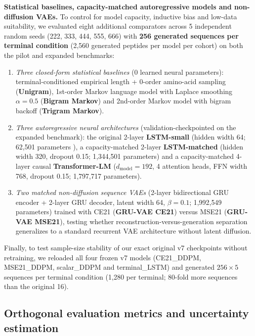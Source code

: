 \documentclass[unnumsec,webpdf,contemporary,large]{oup-authoring-template}
\newcommand{\rev}[1]{#1}
\begin{document}
\rev{\textbf{Statistical baselines, capacity-matched autoregressive models and non-diffusion VAEs.} To control for model capacity, inductive bias and low-data suitability, we evaluated eight additional comparators across 5 independent random seeds (222, 333, 444, 555, 666) with \textbf{256 generated sequences per terminal condition} (2,560 generated peptides per model per cohort) on both the pilot and expanded benchmarks:
\begin{enumerate}
\item \textit{Three closed-form statistical baselines} (0 learned neural parameters): terminal-conditioned empirical length + 0-order amino-acid sampling (\textbf{Unigram}), 1st-order Markov language model with Laplace smoothing $\alpha=0.5$ (\textbf{Bigram Markov}) and 2nd-order Markov model with bigram backoff (\textbf{Trigram Markov}).
\item \textit{Three autoregressive neural architectures} (validation-checkpointed on the expanded benchmark): the original 2-layer \textbf{LSTM-small} (hidden width 64; 62,501 parameters \cite{refLSTM}), a capacity-matched 2-layer \textbf{LSTM-matched} (hidden width 320, dropout 0.15; 1,344,501 parameters) and a capacity-matched 4-layer causal \textbf{Transformer-LM} ($d_{\mathrm{model}}=192$, 4 attention heads, FFN width 768, dropout 0.15; 1,797,717 parameters).
\item \textit{Two matched non-diffusion sequence VAEs} (2-layer bidirectional GRU encoder + 2-layer GRU decoder, latent width 64, $\beta=0.1$; 1,992,549 parameters) trained with CE21 (\textbf{GRU-VAE CE21}) versus MSE21 (\textbf{GRU-VAE MSE21}), testing whether reconstruction-versus-generation separation generalizes to a standard recurrent VAE architecture without latent diffusion.
\end{enumerate}
Finally, to test sample-size stability of our exact original v7 checkpoints without retraining, we reloaded all four frozen v7 models (CE21\_DDPM, MSE21\_DDPM, scalar\_DDPM and terminal\_LSTM) and generated $256\times 5$ sequences per terminal condition (1,280 per terminal; 80-fold more sequences than the original 16).}

\subsection{Orthogonal evaluation metrics and uncertainty estimation}
\end{document}
